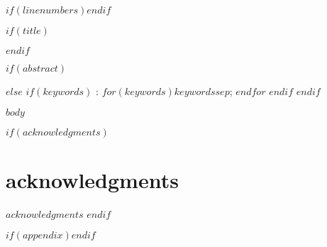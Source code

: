 \documentclass[$if(fontsize)$$fontsize$,$endif$$if(papersize)$$papersize$,$endif$$for(classoption)$$classoption$$sep$,$endfor$]{$documentclass$}
\author{$author.name$}
\begin{document}
\raggedright
$if(linenumbers)$\linenumbers$endif$

$if(title)$\maketitle\thispagestyle{empty}$endif$

$if(abstract)$
\begin{abstract}
\noindent $abstract$

$if(graphicalabstract)$
$endif$

$if(keywords)$
\vspace{0.5\baselineskip}
: $for(keywords)$$keywords$$sep$; $endfor$
$endif$
\end{abstract}
$else$
$if(keywords)$
: $for(keywords)$$keywords$$sep$; $endfor$
$endif$
$endif$

$body$

$if(acknowledgments)$
\section*{acknowledgments}
$acknowledgments$
$endif$

$if(appendix)$$endif$
\end{document}

